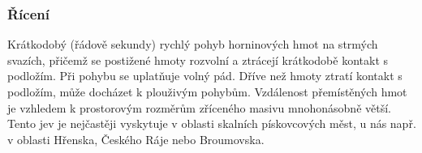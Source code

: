 \subsubsection{Řícení}
Krátkodobý (řádově sekundy) rychlý pohyb horninových hmot na strmých svazích, přičemž se postižené hmoty rozvolní a ztrácejí krátkodobě kontakt s podložím. Při pohybu se uplatňuje volný pád. Dříve než hmoty ztratí kontakt s podložím, může docházet k plouživým pohybům. Vzdálenost přemístěných hmot je vzhledem k prostorovým rozměrům zříceného masivu mnohonásobně větší. Tento jev je nejčastěji vyskytuje v oblasti skalních pískovcových měst, u nás např. v oblasti Hřenska, Českého Ráje nebo Broumovska.

